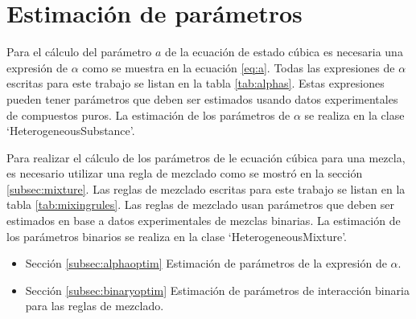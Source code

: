 \section{Estimación de parámetros}\label{sec:optimization}

	Para el cálculo del parámetro $a$ de la ecuación de estado cúbica es necesaria una expresión de $\alpha$ como se muestra en la ecuación \ref{eq:a}. Todas las expresiones de $\alpha$ escritas para este trabajo se listan en la tabla \ref{tab:alphas}. Estas expresiones pueden tener parámetros que deben ser estimados usando datos experimentales de compuestos puros. La estimación de los parámetros de $\alpha$ se realiza en la clase `HeterogeneousSubstance'.

	Para realizar el cálculo de los parámetros de le ecuación cúbica para una mezcla, es necesario utilizar una regla de mezclado como se mostró en la sección \ref{subsec:mixture}. Las reglas de mezclado escritas para este trabajo se listan en la tabla \ref{tab:mixingrules}. Las reglas de mezclado usan parámetros que deben ser estimados en base a datos experimentales de mezclas binarias. La estimación de los parámetros binarios se realiza en la clase `HeterogeneousMixture'.

	\begin{itemize}
		\item{Sección} \ref{subsec:alphaoptim} Estimación de parámetros de la expresión de $\alpha$.
		\item{Sección} \ref{subsec:binaryoptim} Estimación de parámetros de interacción binaria para las reglas de mezclado.
	\end{itemize}

	




